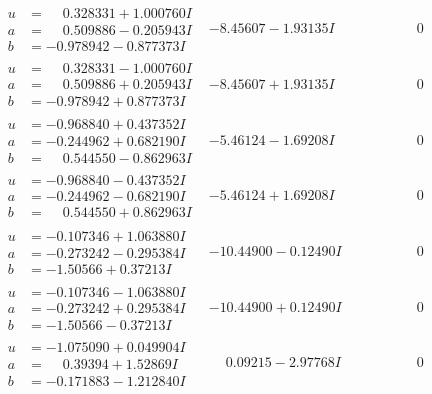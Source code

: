 \documentclass[1p]{elsarticle_modified}
\theoremstyle{definition}
\begin{document}
$$\begin{array}{c|c|c}
\begin{aligned}
u &= \phantom{-}0.328331 + 1.000760 I \\
a &= \phantom{-}0.509886 - 0.205943 I \\
b &= -0.978942 - 0.877373 I\end{aligned}
 & -8.45607 - 1.93135 I & \phantom{-0.000000 } 0 \\ \hline\begin{aligned}
u &= \phantom{-}0.328331 - 1.000760 I \\
a &= \phantom{-}0.509886 + 0.205943 I \\
b &= -0.978942 + 0.877373 I\end{aligned}
 & -8.45607 + 1.93135 I & \phantom{-0.000000 } 0 \\ \hline\begin{aligned}
u &= -0.968840 + 0.437352 I \\
a &= -0.244962 + 0.682190 I \\
b &= \phantom{-}0.544550 - 0.862963 I\end{aligned}
 & -5.46124 - 1.69208 I & \phantom{-0.000000 } 0 \\ \hline\begin{aligned}
u &= -0.968840 - 0.437352 I \\
a &= -0.244962 - 0.682190 I \\
b &= \phantom{-}0.544550 + 0.862963 I\end{aligned}
 & -5.46124 + 1.69208 I & \phantom{-0.000000 } 0 \\ \hline\begin{aligned}
u &= -0.107346 + 1.063880 I \\
a &= -0.273242 - 0.295384 I \\
b &= -1.50566 + 0.37213 I\end{aligned}
 & -10.44900 - 0.12490 I & \phantom{-0.000000 } 0 \\ \hline\begin{aligned}
u &= -0.107346 - 1.063880 I \\
a &= -0.273242 + 0.295384 I \\
b &= -1.50566 - 0.37213 I\end{aligned}
 & -10.44900 + 0.12490 I & \phantom{-0.000000 } 0 \\ \hline\begin{aligned}
u &= -1.075090 + 0.049904 I \\
a &= \phantom{-}0.39394 + 1.52869 I \\
b &= -0.171883 - 1.212840 I\end{aligned}
 & \phantom{-}0.09215 - 2.97768 I & \phantom{-0.000000 } 0 \\ \hline\begin{aligned}

\end{aligned}
\end{array}$$
\end{document}

